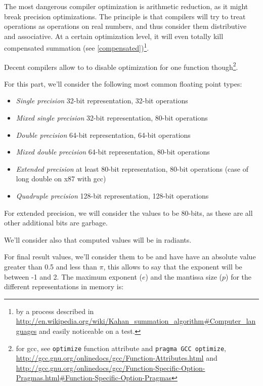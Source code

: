 \label{arithmeticreduction}

The most dangerous compiler optimization is arithmetic reduction, as it might break precision optimizations. The principle is that compilers will try to treat operations as operations on real numbers, and thus consider them distributive and associative. At a certain optimization level, it will even totally kill compensated summation (see \ref{compensated})\footnote{by a process described in \url{http://en.wikipedia.org/wiki/Kahan_summation_algorithm\#Computer_languages} and easily noticeable on a test.}.

Decent compilers allow to to disable optimization for one function though\footnote{for gcc, see \texttt{optimize} function attribute and \texttt{pragma GCC optimize}, \url{http://gcc.gnu.org/onlinedocs/gcc/Function-Attributes.html} and \url{http://gcc.gnu.org/onlinedocs/gcc/Function-Specific-Option-Pragmas.html\#Function-Specific-Option-Pragmas}}.


For this part, we'll consider the following most common floating point types:

\begin{itemize}
\item \emph{Single precision} 32-bit representation, 32-bit operations
\item \emph{Mixed single precision} 32-bit representation, 80-bit operations
\item \emph{Double precision} 64-bit representation, 64-bit operations
\item \emph{Mixed double precision} 64-bit representation, 80-bit operations
\item \emph{Extended precision} at least 80-bit representation, 80-bit operations (case of long double on x87 with gcc)
\item \emph{Quadruple precision} 128-bit representation, 128-bit operations
\end{itemize}

For extended precision, we will consider the values to be 80-bits, as these are all other additional bits are garbage.

We'll consider also that computed values will be in radiants.

For final result values, we'll consider them to be and have have an absolute value greater than 0.5 and less than $\pi$, this allows to say that the exponent will be between -1 and 2. The maximum exponent ($e$) and the mantissa size ($p$) for the different representations in memory is:

